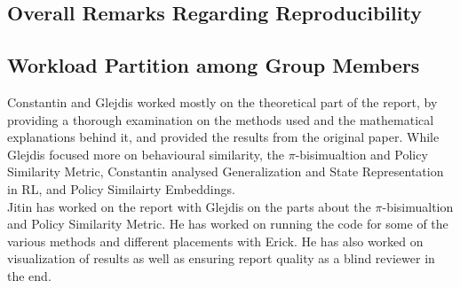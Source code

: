 \documentclass{usiinftr}
\begin{document}
\subsection{Overall Remarks Regarding Reproducibility}
\subsection{Workload Partition among Group Members}
Constantin and Glejdis worked mostly on the theoretical part of the report, by providing a thorough examination on the methods used and the mathematical explanations behind it, and provided the results from the original paper. While Glejdis focused more on behavioural similarity, the $\pi$-bisimualtion and Policy Similarity Metric, Constantin analysed Generalization and State Representation in RL, and Policy Similairty Embeddings. \\
Jitin has worked on the report with Glejdis on the parts about the $\pi$-bisimualtion and Policy Similarity Metric. He has worked on running the code for some of the various methods and different placements with Erick. He has also worked on visualization of results as well as ensuring report quality as a blind reviewer in the end.\\


\end{document}
